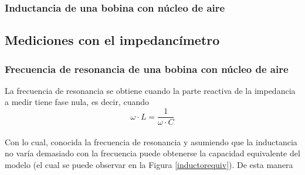\documentclass[a4paper,10pt]{article}
\begin{document}
		\subsubsection{Inductancia de una bobina con n\'ucleo de aire}
		
		\subsection{Mediciones con el impedanc\'imetro}
		\subsubsection{Frecuencia de resonancia de una bobina con n\'ucleo de aire}
		La frecuencia de resonancia se obtiene cuando la parte reactiva de la impedancia a medir tiene fase nula, es decir, cuando
		$$\omega\cdot L=\frac{1}{\omega \cdot C}$$
		\\Con lo cual, conocida la frecuencia de resonancia y asumiendo que la inductancia no var\'ia demasiado con la frecuencia puede obtenerse la capacidad equivalente del modelo (el cual se puede observar en la Figura \ref{inductorequiv}). De esta manera
		
\end{document}
